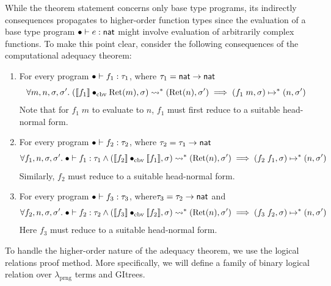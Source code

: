 \documentclass{article}
\theoremstyle{definition}
\theoremstyle{plain}
\theoremstyle{remark}
\newcommand{\prng}{\mathrm{prng}}
\newcommand{\redu}{\mapsto}
\newcommand{\Redu}{\rightsquigarrow}
\newcommand{\gRet}{\mathrm{Ret}}
\newcommand{\cbvap}{\bullet_{\text{cbv}}}
\begin{document}
While the theorem statement concerns only base type programs, its indirectly consequences propagates to higher-order function types since the evaluation of a base type program \({\bullet}\vdash{e}\mathrel{:}{{ {\mathsf{nat}}}}\) might involve evaluation of arbitrarily complex functions.
To make this point clear, consider the following consequences of the computational adequacy theorem:
\begin{enumerate}
  \item For every program \({\bullet}\vdash{f_1}\mathrel{:}{\tau_1}\), where \(\tau_1 = { {\mathsf{nat}}} \to { {\mathsf{nat}}}\) 
    \[
      \forall m,n,\sigma,\sigma'.\; (\sem{f_1}\cbvap \gRet(m),\sigma) \Redu^* (\gRet(n),\sigma')
      \implies (f_1\;m,\sigma) \redu^* (n,\sigma')
    \]
    Note that for \(f_1\;m\) to evaluate to \(n\), \(f_1\) must first reduce to a suitable head-normal form.
  \item For every program \({\bullet}\vdash{f_2}\mathrel{:}{\tau_2}\), where \(\tau_2 = \tau_1 \to { {\mathsf{nat}}}\) 
    \[
      \forall f_1, n,\sigma,\sigma' .\;
      \typed{\bullet}{f_1}{\tau_1}
      \land (\sem{f_2}\cbvap \sem{f_1},\sigma) \Redu^* (\gRet(n),\sigma')
      \implies (f_2\;f_1,\sigma) \redu^* (n,\sigma')
    \]
    Similarly, \(f_2\) must reduce to a suitable head-normal form.
  \item For every program \({\bullet}\vdash{f_3}\mathrel{:}{\tau_3}\), where\(\tau_3 = \tau_2 \to { {\mathsf{nat}}}\) and 
    \[
      \forall f_2, n, \sigma, \sigma' .\;
      \typed{\bullet}{f_2}{\tau_2}
      \land (\sem{f_3}\cbvap \sem{f_2},\sigma) \Redu^* (\gRet(n),\sigma')
      \implies (f_3\;f_2,\sigma) \redu^* (n,\sigma')
    \]
    Here \(f_3\) must reduce to a suitable head-normal form.
\end{enumerate}
To handle the higher-order nature of the adequacy theorem, we use the logical relations proof method.
More specifically, we will define a family of binary logical relation over \(\lambda_\prng\) terms and GItrees.\par
\end{document}
